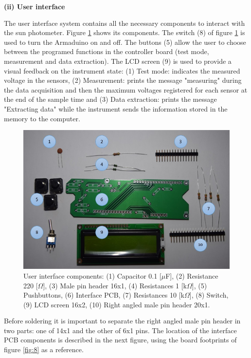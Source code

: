 \documentclass[12pt,letterpaper]{article}
\numberwithin{figure}{section}
\numberwithin{equation}{section}
\numberwithin{table}{section}
\begin{document}
\begin{flushleft}
\textbf{(ii) User interface}
\end{flushleft}

The user interface system contains all the necessary components to interact with the sun photometer. Figure \ref{fig:7} shows its components. The switch (8) of figure \ref{fig:7} is used to turn the Armaduino on and off. The buttons (5) allow the user to choose between the programed functions in the controller board (test mode, measurement and data extraction). The LCD screen (9) is used to provide a visual feedback on the instrument state: (1) Test mode: indicates the measured voltage in the sensors, (2) Measurement: prints the message "measuring" during the data acquisition and then the maximum voltages registered for each sensor at the end of the sample time and (3) Data extraction: prints the message "Extracting data" while the instrument sends the information stored in the memory to the computer.

\begin{figure}[H]
    \centering
    \includegraphics[scale=0.65]{Figuras/figure_7.jpg}
    \caption{User interface components: (1) Capacitor 0.1 [$\mu$F], (2) Resistance 220 [$\Omega$], (3) Male pin header 16x1, (4) Resistances 1 [k$\Omega$], (5) Pushbuttons, (6) Interface PCB, (7) Resistances 10 [k$\Omega$], (8) Switch, (9) LCD screen 16x2, (10) Right angled male pin header 20x1.}
    \label{fig:7}
\end{figure}

Before soldering it is important to separate the right angled male pin header in two parts: one of 14x1 and the other of 6x1 pins. The location of the interface PCB components is described in the next figure, using the board footprints of figure \ref{fig:8} as a reference.
\end{document}
